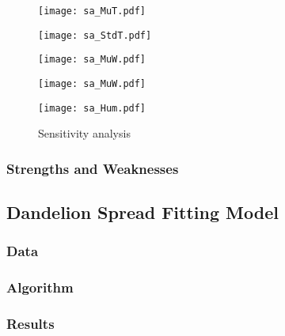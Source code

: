 \documentclass[12pt]{article}
\begin{document}
			\begin{figure}
				\centering
				\begin{minipage}{0.04\textwidth}\end{minipage}
				\begin{minipage}{0.46\textwidth}
					\texttt{[image: sa\_MuT.pdf]}
				\end{minipage}
				\begin{minipage}{0.46\textwidth}
					\texttt{[image: sa\_StdT.pdf]}
				\end{minipage}
				\begin{minipage}{0.04\textwidth}\end{minipage}
				
				\begin{minipage}{0.04\textwidth}\end{minipage}
				\begin{minipage}{0.46\textwidth}
					\texttt{[image: sa\_MuW.pdf]}
				\end{minipage}
				\begin{minipage}{0.46\textwidth}
					\texttt{[image: sa\_MuW.pdf]}
				\end{minipage}
				\begin{minipage}{0.04\textwidth}\end{minipage}
				
				\texttt{[image: sa\_Hum.pdf]}
				\caption{Sensitivity analysis}
				\label{fig:sa}
			\end{figure}
			
		\subsubsection{Strengths and Weaknesses}
		
	\subsection{Dandelion Spread Fitting Model}
		
		\subsubsection{Data}
		
		\subsubsection{Algorithm}
		
		\subsubsection{Results}
		
\end{document}
